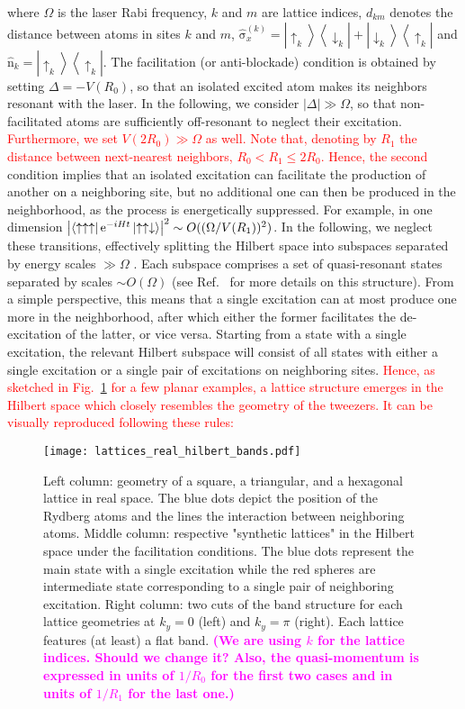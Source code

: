 \documentclass[prl,aps,twocolumn,showpacs,superscriptaddress,longbibliography]{revtex4-1}
\newcommand{\rme}[1]{{\rm{e}}^{#1}}
\newcommand{\lan}{\left\langle}
\newcommand{\ran}{\right\rangle}
\newcommand{\abs}[1]{\left| #1 \right|}
\newcommand{\ket}[1]{\left| #1 \ran}
\newcommand{\bra}[1]{\lan #1 \right|}
\newcommand{\proj}[1]{\ket{#1} \bra{#1}}
\newcommand{\changer}[1]{\textcolor{red}{#1}}
\newcommand{\tochange}[1]{\textcolor{magenta}{#1}}
\newcommand{\mm}[1]{{\tochange{\footnotesize{\bf (#1)}}}}
\newcommand{\up}{\uparrow}
\newcommand{\down}{\downarrow}
\newcommand{\op}[1]{\mathrm{\hat{#1}}}
\begin{document}
where $\Omega$ is the laser Rabi frequency, $k$ and $m$ are lattice indices, $d_{km}$ denotes the distance between atoms in sites $k$ and $m$, $\op{\sigma}_x^{(k)} = \ket{\up_k} \bra{\down_k} + \ket{\down_k} \bra{\up_k}$ and $\op{n}_k = \proj{\up_k}$. The facilitation (or anti-blockade) condition is obtained by setting $\Delta = -V(R_0)$, so that an isolated excited atom makes its neighbors resonant with the laser. In the following, we consider $\abs{\Delta} \gg \Omega$, so that non-facilitated atoms are sufficiently off-resonant to neglect their excitation. \changer{Furthermore, we set $V(2R_0) \gg \Omega$ as well. Note that, denoting by $R_1$ the distance between next-nearest neighbors, $R_0 < R_1 \leq 2R_0$. Hence, the second} condition implies that an isolated excitation can facilitate the production of another on a neighboring site, but no additional one can then be produced in the neighborhood, as the process is energetically suppressed. For example, in one dimension $\abs{\bra{\up \up \up} \rme{-iHt} \ket{\up \up \down}}^2 \sim O((\Omega / V(R_1))^2)$. In the following, we neglect these transitions, effectively splitting the Hilbert space into subspaces separated by energy scales $\gg \Omega$ . Each subspace comprises a set of quasi-resonant states separated by scales $\sim O(\Omega)$ (see Ref.~\cite{a_Marcuzzi_PRL_17} for more details on this structure). From a simple perspective, this means that a single excitation can at most produce one more in the neighborhood, after which either the former facilitates the de-excitation of the latter, or vice versa. Starting from a state with a single excitation, the relevant Hilbert subspace will consist of all states with either a single excitation or a single pair of excitations on neighboring sites. \changer{Hence, as sketched in Fig.~\ref{Fig:flat_band_lattices} for a few planar examples, a lattice structure emerges in the Hilbert space which closely resembles the geometry of the tweezers. It can be visually reproduced following these rules:}
\begin{figure}
\texttt{[image: lattices\_real\_hilbert\_bands.pdf]}
\caption{Left column: geometry of a square, a triangular, and a hexagonal lattice in real space. The blue dots depict the position of the Rydberg atoms and the lines the interaction between neighboring atoms. Middle column: respective "synthetic lattices" in the Hilbert space under the facilitation conditions. The blue dots represent the main state with a single excitation while the red spheres are intermediate state corresponding to a single pair of neighboring excitation. Right column: two cuts of the band structure for each lattice geometries at $k_y= 0$ (left) and $k_y = \pi$ (right). Each lattice features (at least) a flat band. \mm{We are using $k$ for the lattice indices. Should we change it? Also, the quasi-momentum is expressed in units of $1/R_0$ for the first two cases and in units of $1/R_1$ for the last one.}}
\label{Fig:flat_band_lattices}
\end{figure}
\end{document}
